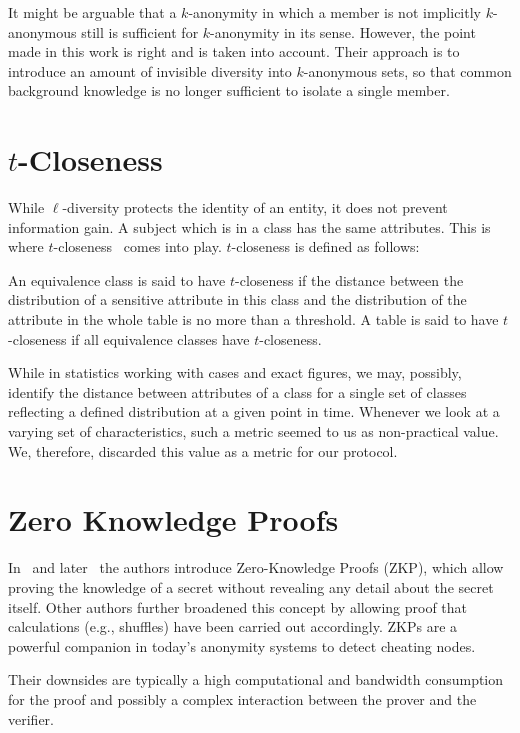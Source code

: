 It might be arguable that a $k$-anonymity in which a member is not implicitly $k$-anonymous still is sufficient for $k$-anonymity in its sense. However, the point made in this work is right and is taken into account. Their approach is to introduce an amount of invisible diversity into $k$-anonymous sets, so that common background knowledge is no longer sufficient to isolate a single member.

\section{\texorpdfstring{$t$}{t}-Closeness}
While $\ell$-diversity protects the identity of an entity, it does not prevent information gain. A subject which is in a class has the same attributes. This is where $t$-closeness~\cite{li2007t} comes into play. $t$-closeness is defined as follows:

\begin{shadequote}{}
	An equivalence class is said to have $t$-closeness if the distance between the distribution of a sensitive attribute in this class and the distribution of the attribute in the whole table is no more than a threshold. A table is said to have $t$-closeness if all equivalence classes have $t$-closeness.
\end{shadequote}

While in statistics working with cases and exact figures, we may, possibly, identify the distance between attributes of a class for a single set of classes reflecting a defined distribution at a given point in time. Whenever we look at a varying set of characteristics, such a metric seemed to us as non-practical value. We, therefore, discarded this value as a metric for our protocol.

\section{Zero Knowledge Proofs}
In~\cite{goldwasser1989knowledge} and later~\cite{de1987non} the authors introduce Zero-Knowledge Proofs (ZKP), which allow proving the knowledge of a secret without revealing any detail about the secret itself. Other authors further broadened this concept by allowing proof that calculations (e.g., shuffles) have been carried out accordingly. ZKPs are a powerful companion in today's anonymity systems to detect cheating nodes.

Their downsides are typically a high computational and bandwidth consumption for the proof and possibly a complex interaction between the prover and the verifier.

